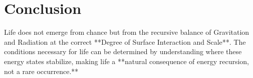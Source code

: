 \documentclass{article}
\begin{document}
\section{Conclusion}
Life does not emerge from chance but from the recursive balance of Gravitation and Radiation at the correct **Degree of Surface Interaction and Scale**. The conditions necessary for life can be determined by understanding where these energy states stabilize, making life a **natural consequence of energy recursion, not a rare occurrence.**
\end{document}
